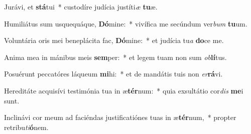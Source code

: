 \item Jurávi, et \textbf{stá}tui~* custodíre judícia justíti\textit{æ} \textbf{tu}æ.
\item Humiliátus sum usquequáque, \textbf{Dó}mine:~* vivífica me secúndum ver\textit{bum} \textbf{tu}um.
\item Voluntária oris mei beneplácita fac, \textbf{Dó}mine:~* et judícia tu\textit{a} \textbf{do}ce me.
\item Anima mea in mánibus meis \textbf{sem}per:~* et legem tuam non sum \textit{ob}\textbf{lí}tus.
\item Posuérunt peccatóres láqueum \textbf{mi}hi:~* et de mandátis tuis non \textit{er}\textbf{rá}vi.
\item Hereditáte acquisívi testimónia tua in æ\textbf{tér}num:~* quia exsultátio cor\textit{dis} \textbf{me}i sunt.
\item Inclinávi cor meum ad faciéndas justificatiónes tuas in æ\textbf{tér}num,~* propter retribu\textit{ti}\textbf{ó}nem.
